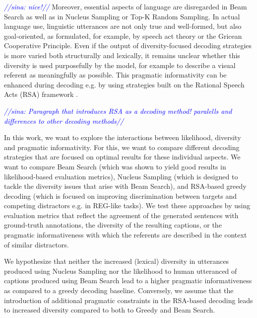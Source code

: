 \documentclass[11pt,a4paper]{article}
\newcommand{\sina}[1]{\textcolor{blue}{\emph{//sina: #1//}}}
\begin{document}
\sina{nice!} Moreover, essential aspects of language are disregarded in Beam Search as well as in Nucleus Sampling or Top-K Random Sampling. In actual language use, linguistic utterances are not only true and well-formed, but also goal-oriented, as formulated, for example, by speech act theory or the Gricean Cooperative Principle. Even if the output of diversity-focused decoding strategies is more varied both structurally and lexically, it remains unclear whether this diversity is used purposefully by the model, for example to describe a visual referent as meaningfully as possible. This pragmatic informativity can be enhanced during decoding e.g. by using strategies built on the Rational Speech Acts (RSA) framework \citep{Cohn-Gordon2018}.

\sina{Paragraph that introduces RSA as a decoding method! paralells and differences to other decoding methods}

In this work, we want to explore the interactions between likelihood, diversity and pragmatic informativity. For this, we want to compare different decoding strategies that are focused on optimal results for these individual aspects. We want to compare Beam Search (which was shown to yield good results in likelihood-based evaluation metrics), Nucleus Sampling (which is designed to tackle the diversity issues that arise with Beam Search), and RSA-based greedy decoding (which is focused on improving discrimination between targets and competing distractors e.g. in REG-like tasks). We test these approaches by using evaluation metrics that reflect the agreement of the generated sentences with ground-truth annotations, the diversity of the resulting captions, or the pragmatic informativeness with which the referents are described in the context of similar distractors.

We hypothesize that neither the increased (lexical) diversity in utterances produced using Nucleus Sampling nor the likelihood to human utteranced of captions produced using Beam Search lead to a higher pragmatic informativeness as compared to a greedy decoding baseline. Conversely, we assume that the introduction of additional pragmatic constraints in the RSA-based decoding leads to increased diversity compared to both to Greedy and Beam Search.
\end{document}
